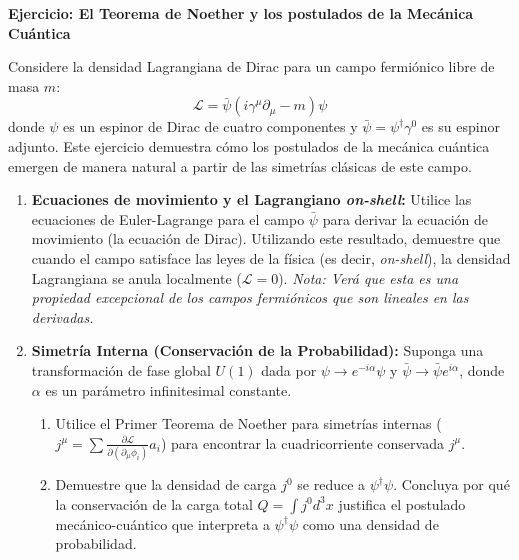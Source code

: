 \vspace{0.5cm}
\noindent \textbf{Ejercicio: El Teorema de Noether y los postulados de la Mecánica Cuántica}

\noindent Considere la densidad Lagrangiana de Dirac para un campo fermiónico libre de masa $m$:
\begin{equation*}
    \mathcal{L} = \bar{\psi}(i\gamma^\mu \partial_\mu - m)\psi
\end{equation*}
donde $\psi$ es un espinor de Dirac de cuatro componentes y $\bar{\psi} = \psi^\dagger \gamma^0$ es su espinor adjunto. Este ejercicio demuestra cómo los postulados de la mecánica cuántica emergen de manera natural a partir de las simetrías clásicas de este campo.

\begin{enumerate}
    \item \textbf{Ecuaciones de movimiento y el Lagrangiano \textit{on-shell}:} 
    Utilice las ecuaciones de Euler-Lagrange para el campo $\bar{\psi}$ para derivar la ecuación de movimiento (la ecuación de Dirac). Utilizando este resultado, demuestre que cuando el campo satisface las leyes de la física (es decir, \textit{on-shell}), la densidad Lagrangiana se anula localmente ($\mathcal{L} = 0$). \textit{Nota: Verá que esta es una propiedad excepcional de los campos fermiónicos que son lineales en las derivadas.}

    \item \textbf{Simetría Interna (Conservación de la Probabilidad):} 
    Suponga una transformación de fase global $U(1)$ dada por $\psi \to e^{-i\alpha}\psi$ y $\bar{\psi} \to \bar{\psi}e^{i\alpha}$, donde $\alpha$ es un parámetro infinitesimal constante.
    \begin{enumerate}
        \item Utilice el Primer Teorema de Noether para simetrías internas ($j^\mu = \sum \frac{\partial \mathcal{L}}{\partial(\partial_\mu\phi_i)} a_i$) para encontrar la cuadricorriente conservada $j^\mu$.
        \item Demuestre que la densidad de carga $j^0$ se reduce a $\psi^\dagger \psi$. Concluya por qué la conservación de la carga total $Q = \int j^0 d^3x$ justifica el postulado mecánico-cuántico que interpreta a $\psi^\dagger \psi$ como una densidad de probabilidad.
    \end{enumerate}


\end{enumerate}

